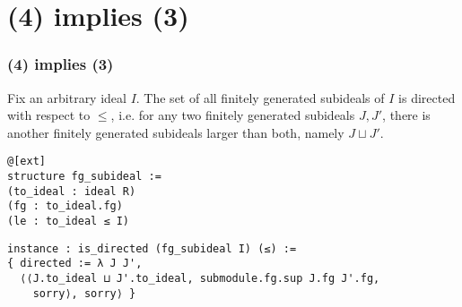 \documentclass[aspectratio=169]{beamer}
\begin{document}
\section*{(4) implies (3)}
\begin{frame}[fragile]
\frametitle{(4) implies (3)}
\begin{minipage}{0.1\textwidth}
\end{minipage}%
\begin{minipage}{0.9\textwidth}
Fix an arbitrary ideal $I$.
The set of all finitely generated subideals of $I$ is directed with respect
to $\le$, i.e. for any two finitely generated subideals $J, J'$, there
is another finitely generated subideals larger than both, namely $J \sqcup J'$.

\begin{minipage}{0.45\textwidth}
\begin{lstlisting}
@[ext]
structure fg_subideal :=
(to_ideal : ideal R)
(fg : to_ideal.fg)
(le : to_ideal ≤ I)
\end{lstlisting}
\end{minipage}%
\begin{minipage}{0.45\textwidth}
\begin{lstlisting}
instance : is_directed (fg_subideal I) (≤) :=
{ directed := λ J J', 
  ⟨⟨J.to_ideal ⊔ J'.to_ideal, submodule.fg.sup J.fg J'.fg, 
    sorry⟩, sorry⟩ }
\end{lstlisting}
\end{minipage}%
\end{minipage}%

\end{frame}
\end{document}
